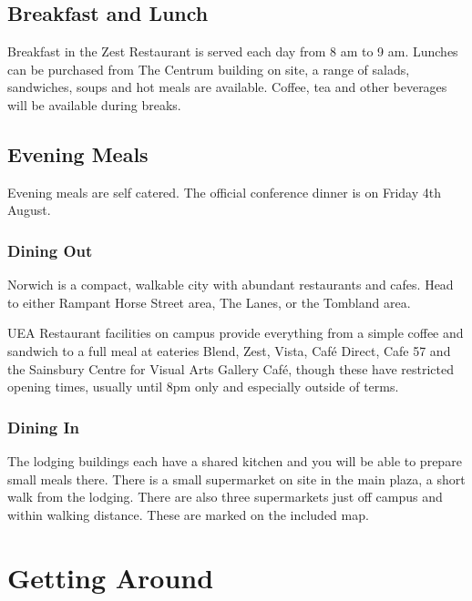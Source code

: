 \documentclass[12pt,]{book}
\theoremstyle{definition}
\theoremstyle{definition}
\theoremstyle{remark}
\begin{document}
\subsection*{Breakfast and Lunch}\label{breakfast-and-lunch}

Breakfast in the Zest Restaurant is served each day from 8 am to 9 am.
Lunches can be purchased from The Centrum building on site, a range of
salads, sandwiches, soups and hot meals are available. Coffee, tea and
other beverages will be available during breaks.

\subsection*{Evening Meals}\label{evening-meals}

Evening meals are self catered. The official conference dinner is on
Friday 4th August.

\subsubsection*{Dining Out}\label{dining-out}

Norwich is a compact, walkable city with abundant restaurants and cafes.
Head to either Rampant Horse Street area, The Lanes, or the Tombland
area.

UEA Restaurant facilities on campus provide everything from a simple
coffee and sandwich to a full meal at eateries Blend, Zest, Vista, Café
Direct, Cafe 57 and the Sainsbury Centre for Visual Arts Gallery Café,
though these have restricted opening times, usually until 8pm only and
especially outside of terms.

\subsubsection*{Dining In}\label{dining-in}

The lodging buildings each have a shared kitchen and you will be able to
prepare small meals there. There is a small supermarket on site in the
main plaza, a short walk from the lodging. There are also three
supermarkets just off campus and within walking distance. These are
marked on the included map.

\section*{Getting Around}\label{getting-around}
\end{document}
